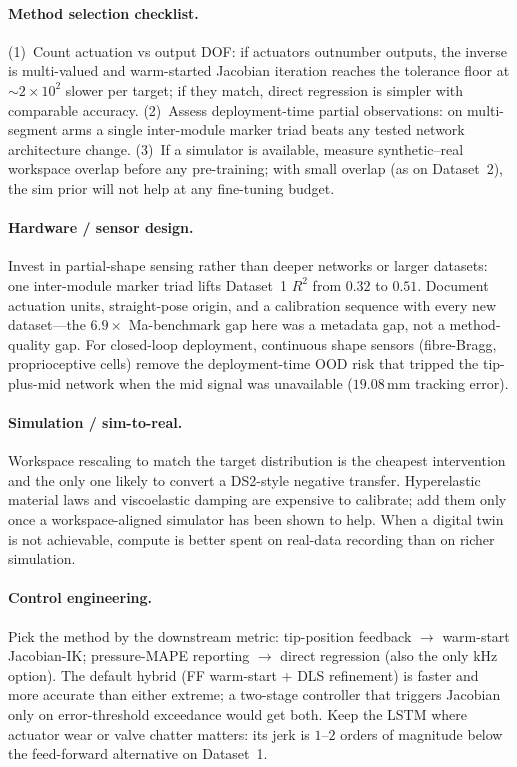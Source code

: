 \paragraph{Method selection checklist.}
(1)~Count actuation vs output DOF: if actuators outnumber outputs, the inverse is multi-valued and warm-started Jacobian iteration reaches the tolerance floor at $\sim$$2\times 10^{2}$ slower per target; if they match, direct regression is simpler with comparable accuracy. (2)~Assess deployment-time partial observations: on multi-segment arms a single inter-module marker triad beats any tested network architecture change. (3)~If a simulator is available, measure synthetic--real workspace overlap before any pre-training; with small overlap (as on Dataset~2), the sim prior will not help at any fine-tuning budget.

\paragraph{Hardware / sensor design.}
Invest in partial-shape sensing rather than deeper networks or larger datasets: one inter-module marker triad lifts Dataset~1 $R^{2}$ from $0.32$ to $0.51$. Document actuation units, straight-pose origin, and a calibration sequence with every new dataset---the $6.9\times$ Ma-benchmark gap here was a metadata gap, not a method-quality gap. For closed-loop deployment, continuous shape sensors (fibre-Bragg, proprioceptive cells) remove the deployment-time OOD risk that tripped the tip-plus-mid network when the mid signal was unavailable ($19.08$\,mm tracking error).

\paragraph{Simulation / sim-to-real.}
Workspace rescaling to match the target distribution is the cheapest intervention and the only one likely to convert a DS2-style negative transfer. Hyperelastic material laws and viscoelastic damping are expensive to calibrate; add them only once a workspace-aligned simulator has been shown to help. When a digital twin is not achievable, compute is better spent on real-data recording than on richer simulation.

\paragraph{Control engineering.}
Pick the method by the downstream metric: tip-position feedback $\to$ warm-start Jacobian-IK; pressure-MAPE reporting $\to$ direct regression (also the only kHz option). The default hybrid (FF warm-start + DLS refinement) is faster and more accurate than either extreme; a two-stage controller that triggers Jacobian only on error-threshold exceedance would get both. Keep the LSTM where actuator wear or valve chatter matters: its jerk is $1$--$2$ orders of magnitude below the feed-forward alternative on Dataset~1.

